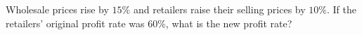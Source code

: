 Wholesale prices rise by $15\%$ and retailers raise their selling prices by $10\%$. If the retailers' original profit rate was $60\%$, what is the new profit rate?
